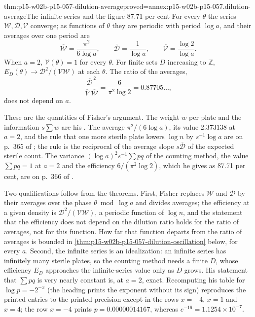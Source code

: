 \begin{hbtheorem}{thm:p15-w02b-p15-057-dilution-average}{proved=annex:p15-w02b-p15-057.dilution-average}{The infinite series and the figure 87.71 per cent}
For every \(\theta\) the series \(\mathcal W,\mathcal D,\mathcal V\)
converge; as functions of \(\theta\) they are periodic with period
\(\log a\), and their averages over one period are
\[
 \overline{\mathcal W}=\frac{\pi^2}{6\log a},\qquad
 \overline{\mathcal D}=\frac1{\log a},\qquad
 \overline{\mathcal V}=\frac{\log2}{\log a}.
\]
When \(a=2\), \(\mathcal V(\theta)=1\) for every \(\theta\). For finite sets
\(D\) increasing to \(\mathbb Z\), \(E_D(\theta)\to\mathcal D^2/(\mathcal
V\mathcal W)\) at each \(\theta\). The ratio of the averages,
\[
 \frac{\overline{\mathcal D}^{\,2}}{\overline{\mathcal V}\,\overline{\mathcal W}}
 =\frac{6}{\pi^2\log2}=0.87705\ldots,
\]
does not depend on \(a\).
\end{hbtheorem}

These are the quantities of Fisher's argument. The weight \(w\) per plate
and the information \(s\sum w\) are his
\cite[p.~364]{Fisher1922Foundations}. The average \(\pi^2/(6\log a)\), its
value \(2.373138\) at \(a=2\), and the rule that one more sterile plate
lowers \(\log n\) by \(s^{-1}\log a\) are on p.~365 of
\cite{Fisher1922Foundations}; the rule is the reciprocal of the average
slope \(s\overline{\mathcal D}\) of the expected sterile count. The variance
\((\log a)^2s^{-1}\sum pq\) of the counting method, the value
\(\sum pq=1\) at \(a=2\) and the efficiency \(6/(\pi^2\log2)\), which he
gives as 87.71 per cent, are on p.~366 of \cite{Fisher1922Foundations}.

Two qualifications follow from the theorems. First, Fisher replaces
\(\mathcal W\) and \(\mathcal D\) by their averages over the phase
\(\theta\bmod\log a\) and divides averages; the efficiency at a given
density is \(\mathcal D^2/(\mathcal V\mathcal W)\), a periodic function of
\(\log n\), and the statement that the efficiency does not depend on the
dilution ratio holds for the ratio of averages, not for this function.
How far that function departs from the ratio of averages is bounded in
\cref{thm:p15-w02b-p15-057-dilution-oscillation} below, for every \(a\).
Second, the infinite series is an idealization: an infinite series
has infinitely many sterile plates, so the counting method needs a finite
\(D\), whose efficiency \(E_D\) approaches the infinite-series value only
as \(D\) grows. His statement that \(\sum pq\) is very nearly constant
is, at \(a=2\), exact. Recomputing his table for \(\log p=-2^{-x}\) (the
heading prints the exponent without its sign) reproduces the printed
entries to the printed precision except in the rows \(x=-4\), \(x=1\) and
\(x=4\); the row \(x=-4\) prints \(p=0.00000014167\), whereas
\(e^{-16}=1.1254\times10^{-7}\).

